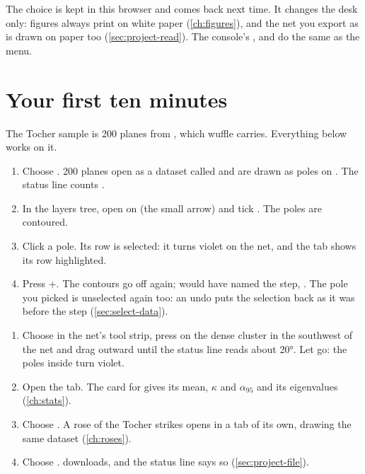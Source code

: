 The choice is kept in this browser and comes back next time. It changes the desk only: figures always
print on white paper (\cref{ch:figures}), and the net you export as  is drawn on paper too
(\cref{sec:project-read}). The console's ,  and  do
the same as the menu.

\section{Your first ten minutes}\label{sec:first-data}

The Tocher sample is 200 planes from \textcite{tocher1979}, which wuffle carries.
Everything below works on it.

\begin{tryit}
\begin{enumerate}
\item Choose . 200 planes open as a dataset called 
and are drawn as poles on . The status line counts .
\item In the layers tree, open  on  (the small arrow) and tick . The
poles are contoured.
\item Click a pole. Its row is selected: it turns violet on the net, and the  tab shows its
row highlighted.
\item Press +. The contours go off again;  would have named the step,
. The pole you picked is unselected again too: an undo puts the selection
back as it was before the step (\cref{sec:select-data}).
\end{enumerate}
\end{tryit}

\begin{tryit}
\begin{enumerate}
\item Choose  in the net's tool strip, press on the dense cluster in the southwest of the net
and drag outward until the status line reads about 20°. Let go: the poles inside turn violet.
\item Open the  tab. The card for  gives its mean, $\kappa$ and $\alpha_{95}$
and its eigenvalues (\cref{ch:stats}).
\item Choose . A rose of the Tocher strikes opens in a tab of its own,
drawing the same dataset (\cref{ch:roses}).
\item Choose .  downloads, and the
status line says so (\cref{sec:project-file}).
\end{enumerate}
\end{tryit}

